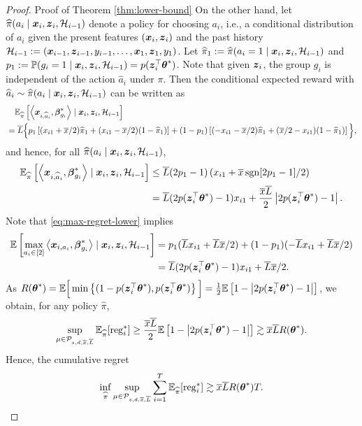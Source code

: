 \begin{proof}{Proof of Theorem \ref{thm:lower-bound}}
	On the other hand, let $\widehat\pi(a_i \mid \boldsymbol{x}_i, \boldsymbol{z}_i, {\cal H}_{i-1})$ denote a policy for choosing $a_i$, i.e., a conditional distribution of $a_i$ given the present features $(\boldsymbol{x}_i, \boldsymbol{z}_i)$ and the past history ${\cal H}_{i-1}:=(\boldsymbol{x}_{i-1}, \boldsymbol{z}_{i-1}, y_{i-1}, \dots, \boldsymbol{x}_{1}, \boldsymbol{z}_{1}, y_{1})$. Let $\widehat\pi_1:=\widehat\pi(a_i=1 \mid \boldsymbol{x}_i, \boldsymbol{z}_i, {\cal H}_{i-1})$ and $p_1:=\mathbb{P}(g_i=1 \mid \boldsymbol{x}_i, \boldsymbol{z}_i, {\cal H}_{i-1})=p(\boldsymbol{z}_i^{\top}\boldsymbol{\theta}^*)$. Note that given $\boldsymbol{z}_i$, the group $g_i$ is independent of the action $\widehat{a}_i$ under $\pi$. Then the conditional expected reward with $\widehat{a}_i \sim \widehat\pi(a_i \mid \boldsymbol{x}_i, \boldsymbol{z}_i, {\cal H}_{i-1})$ can be written as
	\begin{equation}\label{eq:pi-hat-regret}
	\begin{aligned}
			&\quad \mathbb{E}_{\widehat\pi}\left[\left\langle \boldsymbol{x}_{i,\widehat{a}_i}, \boldsymbol{\beta}^*_{g_i} \right\rangle \mid  \boldsymbol{x}_i, \boldsymbol{z}_i, {\cal H}_{i-1} \right]\\
			&=\overline{L}\Big\{p_1\left[(x_{i1}+\overline{x}/2)\widehat\pi_1+(x_{i1}-\overline{x}/2)(1-\widehat\pi_1)\right]+(1-p_1)\left[(-x_{i1}-\overline{x}/2)\widehat\pi_1+(\overline{x}/2-x_{i1})(1-\widehat\pi_1)\right]\Big\},
	\end{aligned}
	\end{equation}
	and hence, for all $\widehat\pi(a_i \mid \boldsymbol{x}_i, \boldsymbol{z}_i, {\cal H}_{i-1})$,
	\begin{align*}
	 \mathbb{E}_{\widehat\pi}\left[\left\langle \boldsymbol{x}_{i,\widehat{a}_i}, \boldsymbol{\beta}^*_{g_i} \right\rangle \mid  \boldsymbol{x}_i, \boldsymbol{z}_i, {\cal H}_{i-1} \right] &\leq \overline{L}(2p_1-1) \left(x_{i1}+\overline{x}\operatorname{sgn}[2p_1-1]/2\right)\\
		&=\overline{L}(2p(\boldsymbol{z}_i^{\top}\boldsymbol{\theta}^*)-1)x_{i1}+\frac{\overline{x}\overline{L}}{2}\left\lvert2p(\boldsymbol{z}_i^{\top}\boldsymbol{\theta}^*)-1\right\rvert.
	\end{align*}
	Note that \eqref{eq:max-regret-lower} implies
	\begin{equation}\label{eq:expected-max-regret-lower}
		\begin{aligned}
				\mathbb{E}\left[\max_{a_i \in [2]}\left\langle \boldsymbol{x}_{i,a_i}, \boldsymbol{\beta}^*_{g_i} \right\rangle \mid \boldsymbol{x}_i, \boldsymbol{z}_i, {\cal H}_{i-1}\right] 
				&= p_1(\overline{L}x_{i1}+\overline{L}\overline{x}/2)+(1-p_1)(-\overline{L}x_{i1}+\overline{L}\overline{x}/2)\\
				&=\overline{L}(2p(\boldsymbol{z}_i^{\top}\boldsymbol{\theta}^*)-1)x_{i1}+\overline{L}\overline{x}/2.
		\end{aligned}
	\end{equation}
	As  $R(\boldsymbol{\theta}^*)=\mathbb{E} \Big[\min\left\{ (1 - p(\boldsymbol{z}_i^\top\boldsymbol{\theta}^*), p(\boldsymbol{z}_i^\top\boldsymbol{\theta}^*) \right\}\Big]=\frac{1}{2}\mathbb{E}\left[1-\left\lvert2p(\boldsymbol{z}_i^{\top}\boldsymbol{\theta}^*)-1\right\rvert\right]$, we obtain, for any policy $\hat\pi$, 
	\[\sup_{\mu \in {\cal P}_{s,d,\overline{x},\overline{L}}}\mathbb{E}_{\widehat\pi}[\operatorname{reg}^*_{i}] \geq \frac{\overline{x}\overline{L}}{2}\mathbb{E}\left[1-\left\lvert2p(\boldsymbol{z}_i^{\top}\boldsymbol{\theta}^*)-1\right\rvert\right] \gtrsim \overline{x}\overline{L}R(\boldsymbol{\theta}^*).\]
	Hence, the cumulative regret 
		\[\inf_{\widehat\pi}\sup_{\mu \in {\cal P}_{s,d,\overline{x},\overline{L}}}\sum_{i=1}^{T}\mathbb{E}_{\widehat\pi}[\operatorname{reg}^*_{i}]\gtrsim \overline{x}\overline{L}R(\boldsymbol{\theta}^*)T.\]
		

\end{proof}
